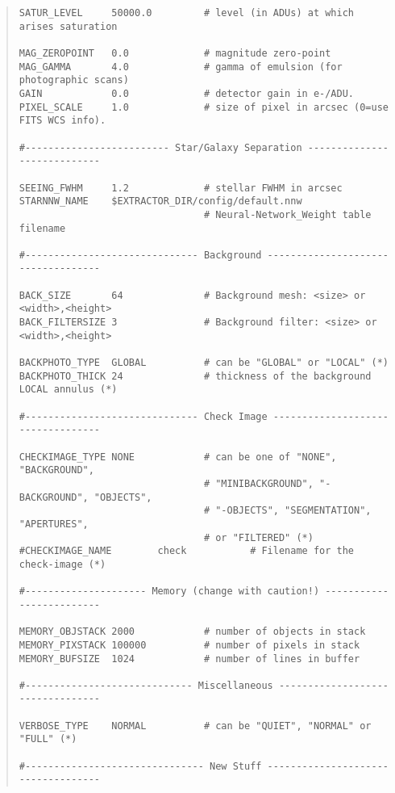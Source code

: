 \documentclass[twoside,11pt]{article}
\renewcommand{\_}{\texttt{\symbol{95}}}
\begin{document}
\begin{quote}
\begin{verbatim}
SATUR_LEVEL     50000.0         # level (in ADUs) at which arises saturation

MAG_ZEROPOINT   0.0             # magnitude zero-point
MAG_GAMMA       4.0             # gamma of emulsion (for photographic scans)
GAIN            0.0             # detector gain in e-/ADU.
PIXEL_SCALE     1.0             # size of pixel in arcsec (0=use FITS WCS info).

#------------------------- Star/Galaxy Separation ----------------------------

SEEING_FWHM     1.2             # stellar FWHM in arcsec
STARNNW_NAME    $EXTRACTOR_DIR/config/default.nnw
                                # Neural-Network_Weight table filename

#------------------------------ Background -----------------------------------

BACK_SIZE       64              # Background mesh: <size> or <width>,<height>
BACK_FILTERSIZE 3               # Background filter: <size> or <width>,<height>

BACKPHOTO_TYPE  GLOBAL          # can be "GLOBAL" or "LOCAL" (*)
BACKPHOTO_THICK 24              # thickness of the background LOCAL annulus (*)

#------------------------------ Check Image ----------------------------------

CHECKIMAGE_TYPE NONE            # can be one of "NONE", "BACKGROUND",
                                # "MINIBACKGROUND", "-BACKGROUND", "OBJECTS",
                                # "-OBJECTS", "SEGMENTATION", "APERTURES",
                                # or "FILTERED" (*)
#CHECKIMAGE_NAME        check           # Filename for the check-image (*)

#--------------------- Memory (change with caution!) -------------------------

MEMORY_OBJSTACK 2000            # number of objects in stack
MEMORY_PIXSTACK 100000          # number of pixels in stack
MEMORY_BUFSIZE  1024            # number of lines in buffer

#----------------------------- Miscellaneous ---------------------------------

VERBOSE_TYPE    NORMAL          # can be "QUIET", "NORMAL" or "FULL" (*)

#------------------------------- New Stuff -----------------------------------
\end{verbatim}\end{quote}
\normalsize

\end{document}

